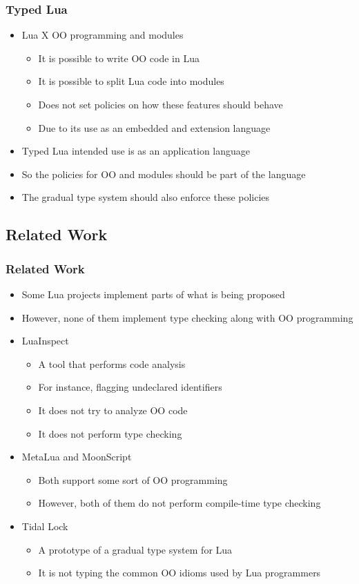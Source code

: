 \documentclass{beamer}
\begin{document}
\begin{frame}
\frametitle{Typed Lua}
\begin{itemize}
\item Lua X OO programming and modules
\begin{itemize}
\item It is possible to write OO code in Lua
\item It is possible to split Lua code into modules
\item Does not set policies on how these features should behave
\item Due to its use as an embedded and extension language
\end{itemize}
\item Typed Lua intended use is as an application language
\item So the policies for OO and modules should be part of the language
\item The gradual type system should also enforce these policies
\end{itemize}
\end{frame}

\subsection{Related Work}
\begin{frame}
\frametitle{Related Work}
\begin{itemize}
\item Some Lua projects implement parts of what is being proposed
\item However, none of them implement type checking along with OO programming
\item LuaInspect
\begin{itemize}
\item A tool that performs code analysis
\item For instance, flagging undeclared identifiers
\item It does not try to analyze OO code
\item It does not perform type checking
\end{itemize}
\item MetaLua and MoonScript
\begin{itemize}
\item Both support some sort of OO programming
\item However, both of them do not perform compile-time type checking
\end{itemize}
\item Tidal Lock
\begin{itemize}
\item A prototype of a gradual type system for Lua
\item It is not typing the common OO idioms used by Lua programmers
\end{itemize}
\end{itemize}
\end{frame}
\end{document}
